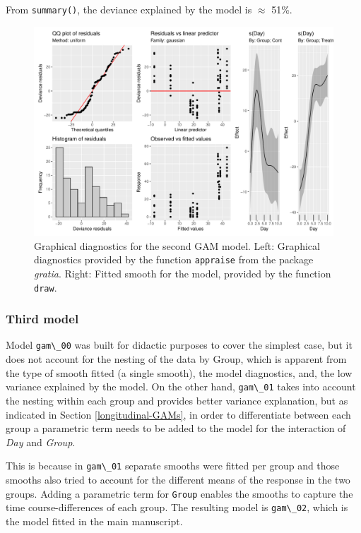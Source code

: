 \documentclass[
]{article}
\newcommand{\passthrough}[1]{#1}
\begin{document}
From \passthrough{\lstinline!summary()!}, the deviance explained by the model is \(\approx\) 51\%.



\begin{figure}

{\centering \includegraphics[width=0.75\linewidth]{SIM_Appendix_files/figure-latex/second-GAM-diag-1} 

}

\caption{Graphical diagnostics for the second GAM model. Left: Graphical diagnostics provided by the function \passthrough{\lstinline!appraise!} from the package \emph{gratia}. Right: Fitted smooth for the model, provided by the function \passthrough{\lstinline!draw!}.}\label{fig:second-GAM-diag}
\end{figure}

\hypertarget{third-model}{%
\subsubsection{Third model}\label{third-model}}

Model \passthrough{\lstinline!gam\_00!} was built for didactic purposes to cover the simplest case, but it does not account for the nesting of the data by Group, which is apparent from the type of smooth fitted (a single smooth), the model diagnostics, and, the low variance explained by the model. On the other hand, \passthrough{\lstinline!gam\_01!} takes into account the nesting within each group and provides better variance explanation, but as indicated in Section \ref{longitudinal-GAMs}, in order to differentiate between each group a parametric term needs to be added to the model for the interaction of \emph{Day} and \emph{Group}.

This is because in \passthrough{\lstinline!gam\_01!} separate smooths were fitted per group and those smooths also tried to account for the different means of the response in the two groups. Adding a parametric term for \passthrough{\lstinline!Group!} enables the smooths to capture the time course-differences of each group. The resulting model is \passthrough{\lstinline!gam\_02!}, which is the model fitted in the main manuscript.
\end{document}
